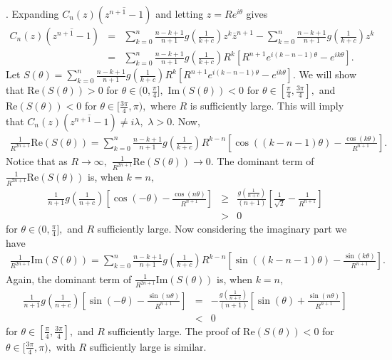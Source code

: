 \documentclass[final]{siamltex}
\begin{document}
. Expanding $C_{n}(z) \left( \overline{z^{n+1} -1} \right)$ and letting $z = Re^{i\theta}$ gives \begin{eqnarray*}
  C_{n}(z) \left( \overline{z^{n+1} -1} \right) & = &   \sum_{k=0}^{n} \frac{n-k+1}{n+1} g \left(\frac{1}{k+c}\right)z^{k}\overline{z}^{n+1} - \sum_{k=0}^{n} \frac{n-k+1}{n+1} g \left(\frac{1}{k+c} \right)z^{k} \\    
 & = & \sum_{k=0}^{n} \frac{n-k+1}{n+1} g \left(\frac{1}{k+c} \right)R^{k} \left[ R^{n+1} e^{i(k-n-1)\theta} - e^{ik\theta} \right].
  \end{eqnarray*}
 Let $S(\theta) = \sum_{k=0}^{n} \frac{n-k+1}{n+1} g \left(\frac{1}{k+c} \right)R^{k} \left[ R^{n+1} e^{i(k-n-1)\theta} - e^{ik\theta} \right].$
 We will show that $\mbox{Re}(S(\theta)) > 0$ for $\theta \in (0, \frac{\pi}{4}],$ $\mbox{Im}(S(\theta)) < 0$ for $\theta \in [\frac{\pi}{4}, \frac{3\pi}{4}],$ and $\mbox{Re} (S(\theta)) < 0$ for $\theta \in [\frac{3\pi}{4}, \pi),$ where $R$ is sufficiently large. This will imply that $C_{n}(z) \left( \overline{ z^{n+1} -1} \right) \neq i \lambda,$ $ \lambda > 0.$ Now,
 \begin{eqnarray*} 
  \frac{1}{R^{2n+1}} \mbox{Re}(S(\theta)) = \sum_{k=0}^{n} \frac{n-k+1}{n+1} g \left(\frac{1}{k+c} \right)R^{k-n} \left[  \cos((k-n-1)\theta) - \frac{\cos(k\theta)}{R^{n+1}} \right].
 \end{eqnarray*}
Notice that as $R \rightarrow \infty,$ $\frac{1}{R^{2n+1}}\mbox{Re}(S(\theta)) \rightarrow 0.$ 
  The dominant term of $\frac{1}{R^{2n+1}}\mbox{Re}(S(\theta))$ is, when $k=n,$ 
 \begin{eqnarray*}  \frac{1}{n+1}g \left( \frac{1}{n+c} \right)  \left[ \cos(-\theta) - \frac{ \cos(n\theta)}{R^{n+1}} \right] & \geq & \frac{g \left( \frac{1}{n+c}\right) }{(n+1)} \left[ \frac{1}{\sqrt{2}} - \frac{1}{R^{n+1}} \right] \\
  & > & 0 
  \end{eqnarray*}
 for $\theta \in (0, \frac{\pi}{4}],$ and $R$ sufficiently large. Now considering the imaginary part we have
  \begin{eqnarray*} \frac{1}{R^{2n+1}} \mbox{Im}(S(\theta)) = \sum_{k=0}^{n} \frac{n-k+1}{n+1} g \left(\frac{1}{k+c} \right)R^{k-n} \left[  \sin((k-n-1)\theta) - \frac{\sin(k\theta)}{R^{n+1}} \right].
 \end{eqnarray*} 
  Again, the dominant term of $\frac{1}{R^{2n+1}}\mbox{Im}(S(\theta))$ is, when $k=n,$ 
 \begin{eqnarray*}  \frac{1}{n+1}g \left( \frac{1}{n+c} \right)  \left[ \sin(-\theta) - \frac{ \sin(n\theta)}{R^{n+1}} \right] & = & -\frac{g \left( \frac{1}{n+c}\right) }{(n+1)} \left[ \sin(\theta) + \frac{ \sin(n\theta)}{R^{n+1}} \right] \\
  & < & 0 
  \end{eqnarray*}
 for $\theta \in [\frac{\pi}{4}, \frac{3\pi}{4}],$ and $R$ sufficiently large. 
 The proof of $\mbox{Re} (S(\theta)) < 0$ for $\theta \in [\frac{3\pi}{4}, \pi),$ with $R$ sufficiently large is similar.
  
\end{document}
